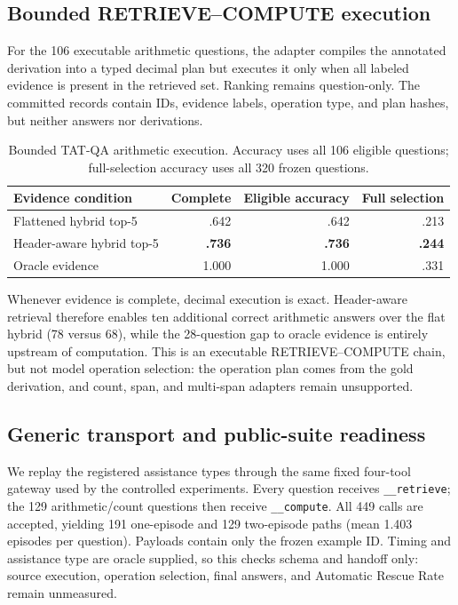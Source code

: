 \documentclass[11pt]{article}
\begin{document}
\subsection{Bounded RETRIEVE--COMPUTE execution}
For the 106 executable arithmetic questions, the adapter compiles the annotated
derivation into a typed decimal plan but executes it only when all labeled
evidence is present in the retrieved set. Ranking remains question-only. The
committed records contain IDs, evidence labels, operation type, and plan hashes,
but neither answers nor derivations.

\begin{table}[t]
\centering\small
\caption{Bounded TAT-QA arithmetic execution. Accuracy uses all 106 eligible
questions; full-selection accuracy uses all 320 frozen questions.}
\label{tab:p25-tatqa-execution}
\begin{tabular}{lrrr}
\toprule
Evidence condition & Complete & Eligible accuracy & Full selection\\
\midrule
Flattened hybrid top-5 & .642 & .642 & .213\\
Header-aware hybrid top-5 & \textbf{.736} & \textbf{.736} & \textbf{.244}\\
Oracle evidence & 1.000 & 1.000 & .331\\
\bottomrule
\end{tabular}
\end{table}

Whenever evidence is complete, decimal execution is exact. Header-aware
retrieval therefore enables ten additional correct arithmetic answers over the
flat hybrid (78 versus 68), while the 28-question gap to oracle evidence is
entirely upstream of computation. This is an executable RETRIEVE--COMPUTE chain,
but not model operation selection: the operation plan comes from the gold
derivation, and count, span, and multi-span adapters remain unsupported.

\subsection{Generic transport and public-suite readiness}
We replay the registered assistance types through the same fixed four-tool
gateway used by the controlled experiments. Every question receives
\texttt{\_\_retrieve}; the 129 arithmetic/count questions then receive
\texttt{\_\_compute}. All 449 calls are accepted, yielding 191 one-episode and
129 two-episode paths (mean 1.403 episodes per question). Payloads contain only
the frozen example ID. Timing and assistance type are oracle supplied, so this
checks schema and handoff only: source execution, operation selection, final
answers, and Automatic Rescue Rate remain unmeasured.
\end{document}
